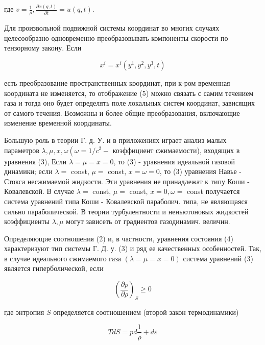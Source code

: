 \documentclass[10pt]{article}
\begin{document}
где $v=\frac{1}{\rho}, \frac{\partial x(q, t)}{\partial t}=u(q, t)$.



Для произвольной подвижной системы координат во многих случаях целесообразно одновременно преобразовывать компоненты скорости по тензорному закону. Если



\[

x^{i}=x^{i}\left(y^{1}, y^{2}, y^{3}, t\right)

\]



есть преобразование пространственных координат, при к-ром временная координата не изменяется, то отображение (5) можно связать с самим течением газа и тогда оно будет определять поле локальных систем координат, зависящих от самого течения. Возможны и более общие преобразования, включающие изменение временной координаты.



Большую роль в теории Г. д. У. и в приложениях играет анализ малых параметров $\lambda, \mu, x, \omega\left(\omega=1 / c^{2}-\right.$ коэффициент сжимаемости), входящих в уравнения (3), Если $\lambda=\mu=x=0$, то (3) - уравнения идеальной газовой динамики; если $\lambda=$ const, $\mu=$ const, $x=\omega=0$, то (3) уравнения Навье - Стокса несжимаемой жидкости. Эти уравнения не принадлежат к типу Коши - Ковалевской. В случае $\lambda=$ const, $\mu=$ const, $x=0, \omega=$ const получается система уравнений типа Коши - Ковалевской параболич. типа, не являющаяся сильно параболической. В теории турбулентности и неньютоновых жидкостей коэффициенты $\lambda, \mu$ могут зависеть от градиентов газодинамич. величин.



Определяющие соотношения (2) и, в частности, уравнения состояния (4) характеризуют тип системы Г. Д. у. (3) и ряд ее качественных особенностей. Так, в случае идеального сжимаемого газа $(\lambda=\mu=x=0)$ система уравнений (3) является гиперболической, если



\[

\left(\frac{\partial p}{\partial \rho}\right)_{S} \geqslant 0

\]



где энтропия $S$ определяется соотношением (второй закон термодинамики)



\[

T d S=p d \frac{1}{\rho}+d \varepsilon

\]
\end{document}
